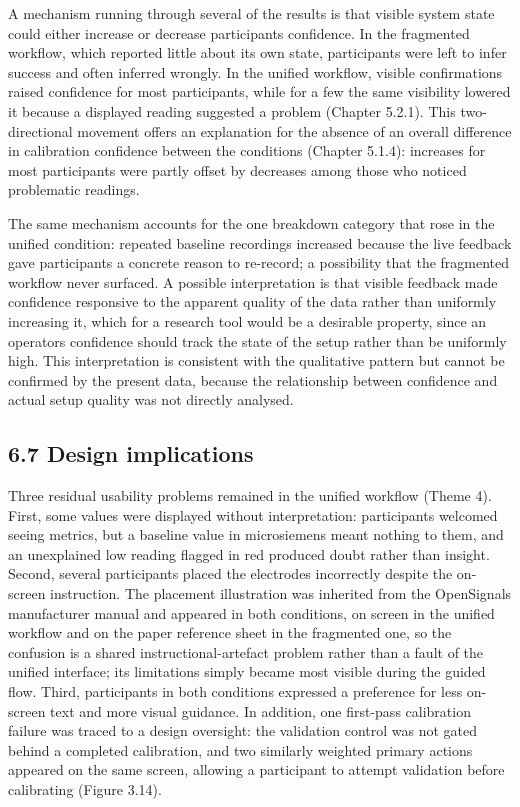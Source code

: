 \documentclass[
]{article}
\begin{document}
A mechanism running through several of the results is that visible system state could either increase or decrease participants\textquotesingle{} confidence. In the fragmented workflow, which reported little about its own state, participants were left to infer success and often inferred wrongly. In the unified workflow, visible confirmations raised confidence for most participants, while for a few the same visibility lowered it because a displayed reading suggested a problem (Chapter 5.2.1). This two-directional movement offers an explanation for the absence of an overall difference in calibration confidence between the conditions (Chapter 5.1.4): increases for most participants were partly offset by decreases among those who noticed problematic readings.

The same mechanism accounts for the one breakdown category that rose in the unified condition: repeated baseline recordings increased because the live feedback gave participants a concrete reason to re-record; a possibility that the fragmented workflow never surfaced. A possible interpretation is that visible feedback made confidence responsive to the apparent quality of the data rather than uniformly increasing it, which for a research tool would be a desirable property, since an operator\textquotesingle s confidence should track the state of the setup rather than be uniformly high. This interpretation is consistent with the qualitative pattern but cannot be confirmed by the present data, because the relationship between confidence and actual setup quality was not directly analysed.

\hypertarget{design-implications}{%
\subsection{6.7 Design implications}\label{design-implications}}

Three residual usability problems remained in the unified workflow (Theme 4). First, some values were displayed without interpretation: participants welcomed seeing metrics, but a baseline value in microsiemens meant nothing to them, and an unexplained low reading flagged in red produced doubt rather than insight. Second, several participants placed the electrodes incorrectly despite the on-screen instruction. The placement illustration was inherited from the OpenSignals manufacturer manual and appeared in both conditions, on screen in the unified workflow and on the paper reference sheet in the fragmented one, so the confusion is a shared instructional-artefact problem rather than a fault of the unified interface; its limitations simply became most visible during the guided flow. Third, participants in both conditions expressed a preference for less on-screen text and more visual guidance. In addition, one first-pass calibration failure was traced to a design oversight: the validation control was not gated behind a completed calibration, and two similarly weighted primary actions appeared on the same screen, allowing a participant to attempt validation before calibrating (Figure 3.14).
\end{document}
